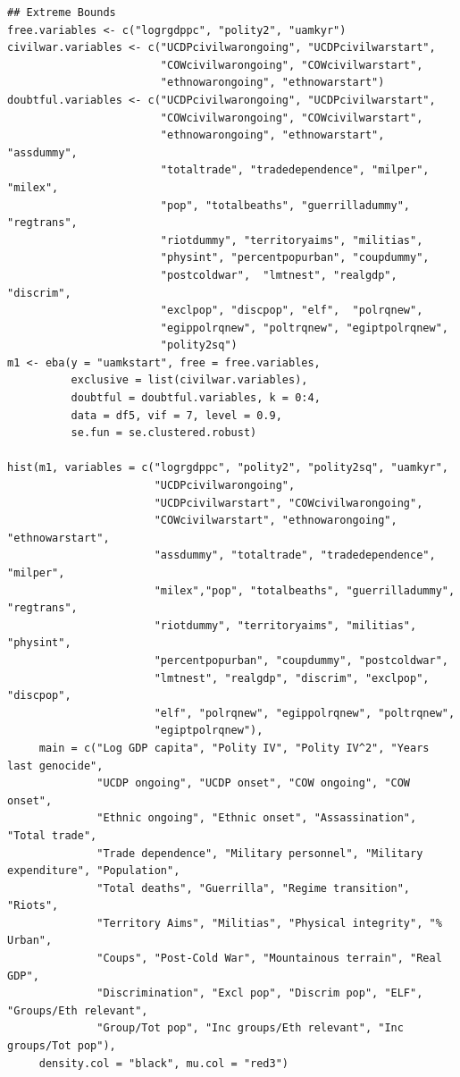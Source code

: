 \documentclass[a4paper,12pt]{article}
\begin{document}
\begin{verbatim}
## Extreme Bounds
free.variables <- c("logrgdppc", "polity2", "uamkyr")
civilwar.variables <- c("UCDPcivilwarongoing", "UCDPcivilwarstart",
                        "COWcivilwarongoing", "COWcivilwarstart",
                        "ethnowarongoing", "ethnowarstart")
doubtful.variables <- c("UCDPcivilwarongoing", "UCDPcivilwarstart",
                        "COWcivilwarongoing", "COWcivilwarstart",
                        "ethnowarongoing", "ethnowarstart", "assdummy",
                        "totaltrade", "tradedependence", "milper", "milex",
                        "pop", "totalbeaths", "guerrilladummy", "regtrans",
                        "riotdummy", "territoryaims", "militias",
                        "physint", "percentpopurban", "coupdummy",
                        "postcoldwar",  "lmtnest", "realgdp", "discrim",
                        "exclpop", "discpop", "elf",  "polrqnew",
                        "egippolrqnew", "poltrqnew", "egiptpolrqnew",
                        "polity2sq")
m1 <- eba(y = "uamkstart", free = free.variables,
          exclusive = list(civilwar.variables),
          doubtful = doubtful.variables, k = 0:4,
          data = df5, vif = 7, level = 0.9, 
          se.fun = se.clustered.robust)
          
hist(m1, variables = c("logrgdppc", "polity2", "polity2sq", "uamkyr",
                       "UCDPcivilwarongoing",
                       "UCDPcivilwarstart", "COWcivilwarongoing",
                       "COWcivilwarstart", "ethnowarongoing", "ethnowarstart",
                       "assdummy", "totaltrade", "tradedependence", "milper",
                       "milex","pop", "totalbeaths", "guerrilladummy", "regtrans",
                       "riotdummy", "territoryaims", "militias", "physint",
                       "percentpopurban", "coupdummy", "postcoldwar",
                       "lmtnest", "realgdp", "discrim", "exclpop", "discpop",
                       "elf", "polrqnew", "egippolrqnew", "poltrqnew",
                       "egiptpolrqnew"),
     main = c("Log GDP capita", "Polity IV", "Polity IV^2", "Years last genocide",
              "UCDP ongoing", "UCDP onset", "COW ongoing", "COW onset", 
              "Ethnic ongoing", "Ethnic onset", "Assassination", "Total trade", 
              "Trade dependence", "Military personnel", "Military expenditure", "Population", 
              "Total deaths", "Guerrilla", "Regime transition", "Riots",
              "Territory Aims", "Militias", "Physical integrity", "% Urban",
              "Coups", "Post-Cold War", "Mountainous terrain", "Real GDP",
              "Discrimination", "Excl pop", "Discrim pop", "ELF", "Groups/Eth relevant", 
              "Group/Tot pop", "Inc groups/Eth relevant", "Inc groups/Tot pop"),
     density.col = "black", mu.col = "red3")


\end{verbatim}
\end{document}
